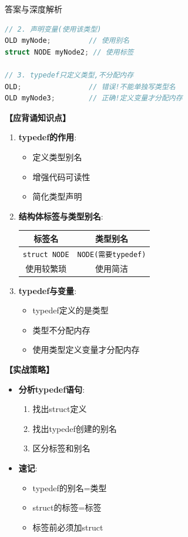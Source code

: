 \documentclass[a4paper,12pt]{article}
\begin{document}
\begin{bluebox}{答案与深度解析}
\begin{lstlisting}[language=C]
// 2. 声明变量(使用该类型)
OLD myNode;         // 使用别名
struct NODE myNode2; // 使用标签

// 3. typedef只定义类型,不分配内存
OLD;                // 错误!不能单独写类型名
OLD myNode3;        // 正确!定义变量才分配内存
    \end{lstlisting}

	\textbf{【应背诵知识点】}

	\begin{enumerate}[leftmargin=*, nosep]
		\item \textbf{typedef的作用}:
		      \begin{itemize}
			      \item 定义类型别名
			      \item 增强代码可读性
			      \item 简化类型声明
		      \end{itemize}

		\item \textbf{结构体标签与类型别名}:
		      \begin{tabular}{|c|c|}
			      \hline
			      \textbf{标签名}         & \textbf{类型别名}            \\
			      \hline
			      \texttt{struct NODE} & \texttt{NODE(需要typedef)} \\
			      \hline
			      使用较繁琐                & 使用简洁                     \\
			      \hline
		      \end{tabular}

		\item \textbf{typedef与变量}:
		      \begin{itemize}
			      \item typedef定义的是类型
			      \item 类型不分配内存
			      \item 使用类型定义变量才分配内存
		      \end{itemize}
	\end{enumerate}

	\textbf{【实战策略】}
	\begin{itemize}[leftmargin=*, nosep]
		\item \textbf{分析typedef语句}:
		      \begin{enumerate}
			      \item 找出struct定义
			      \item 找出typedef创建的别名
			      \item 区分标签和别名
		      \end{enumerate}

		\item \textbf{速记}:
		      \begin{itemize}
			      \item typedef的别名=类型
			      \item struct的标签=标签
			      \item 标签前必须加struct
		      \end{itemize}
	\end{itemize}
\end{bluebox}
\end{document}
